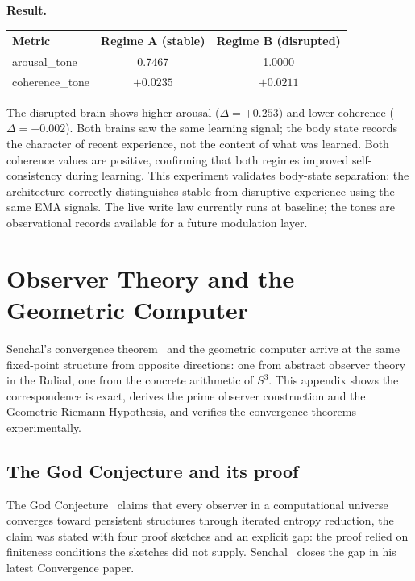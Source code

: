 \documentclass[12pt,a4paper]{article}
\theoremstyle{definition}
\theoremstyle{remark}
\begin{document}
\textbf{Result.}

\begin{center}
\begin{tabular}{lcc}
\toprule
Metric & Regime A (stable) & Regime B (disrupted) \\
\midrule
arousal\_tone  & 0.7467 & 1.0000 \\
coherence\_tone & $+0.0235$ & $+0.0211$ \\
\bottomrule
\end{tabular}
\end{center}

The disrupted brain shows higher arousal ($\Delta = +0.253$) and lower
coherence ($\Delta = -0.002$). Both brains saw the same learning signal;
the body state records the character of recent experience, not the content
of what was learned. Both coherence values are positive, confirming that
both regimes improved self-consistency during learning.
This experiment validates body-state separation: the architecture correctly
distinguishes stable from disruptive experience using the same EMA signals.
The live write law currently runs at baseline; the tones are observational
records available for a future modulation layer.

\section{Observer Theory and the Geometric Computer}
\label{obs:senchal}

\noindent
Senchal's convergence theorem~\cite{senchal2026} and the geometric computer
arrive at the same fixed-point structure from opposite directions: one from
abstract observer theory in the Ruliad, one from the concrete arithmetic of
$S^3$. This appendix shows the correspondence is exact, derives the prime
observer construction and the Geometric Riemann Hypothesis, and verifies the
convergence theorems experimentally.

\subsection{The God Conjecture and its proof}

The God Conjecture~\cite{senchal2025a} claims that every observer in a
computational universe converges toward persistent structures through iterated
entropy reduction, the claim was stated with four proof sketches and an
explicit gap: the proof relied on finiteness conditions the sketches did not
supply.  Senchal~\cite{senchal2026} closes the gap in his latest Convergence paper.
\end{document}
